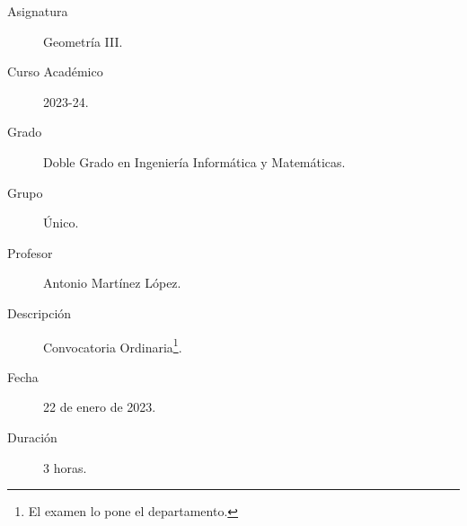 \documentclass[12pt]{article}
\begin{document}

    
    

    \begin{description}
        \item[Asignatura] Geometría III.
        \item[Curso Académico] 2023-24.
        \item[Grado] Doble Grado en Ingeniería Informática y Matemáticas.
        \item[Grupo] Único.
        \item[Profesor] Antonio Martínez López.
        \item[Descripción] Convocatoria Ordinaria\footnote{El examen lo pone el departamento.}.
        \item[Fecha] 22 de enero de 2023.
        \item[Duración] 3 horas.
    
    \end{description}
    \newpage
\end{document}

